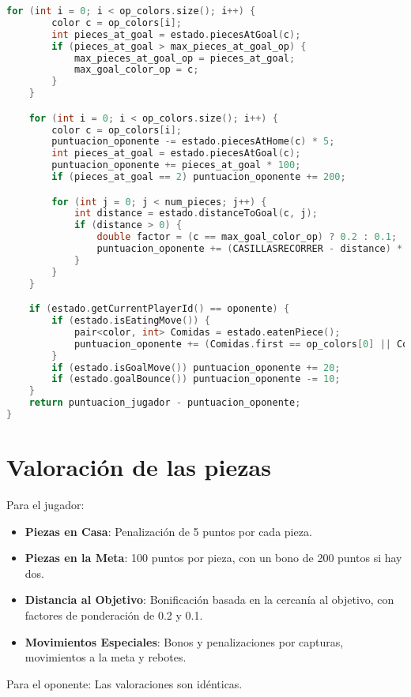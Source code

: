 \documentclass[a4paper, 11pt]{article}
\begin{document}
\begin{lstlisting}[language=C++]
    for (int i = 0; i < op_colors.size(); i++) {
        color c = op_colors[i];
        int pieces_at_goal = estado.piecesAtGoal(c);
        if (pieces_at_goal > max_pieces_at_goal_op) {
            max_pieces_at_goal_op = pieces_at_goal;
            max_goal_color_op = c;
        }
    }

    for (int i = 0; i < op_colors.size(); i++) {
        color c = op_colors[i];
        puntuacion_oponente -= estado.piecesAtHome(c) * 5;
        int pieces_at_goal = estado.piecesAtGoal(c);
        puntuacion_oponente += pieces_at_goal * 100;
        if (pieces_at_goal == 2) puntuacion_oponente += 200;

        for (int j = 0; j < num_pieces; j++) {
            int distance = estado.distanceToGoal(c, j);
            if (distance > 0) {
                double factor = (c == max_goal_color_op) ? 0.2 : 0.1; 
                puntuacion_oponente += (CASILLASRECORRER - distance) * factor;
            }
        }
    }

    if (estado.getCurrentPlayerId() == oponente) {
        if (estado.isEatingMove()) {
            pair<color, int> Comidas = estado.eatenPiece();
            puntuacion_oponente += (Comidas.first == op_colors[0] || Comidas.first == op_colors[1]) ? 10 : 50;
        }
        if (estado.isGoalMove()) puntuacion_oponente += 20;
        if (estado.goalBounce()) puntuacion_oponente -= 10;
    }
    return puntuacion_jugador - puntuacion_oponente;
}
\end{lstlisting}

\section{Valoración de las piezas}

Para el jugador:
\begin{itemize}
    \item \textbf{Piezas en Casa}: Penalización de 5 puntos por cada pieza.
    \item \textbf{Piezas en la Meta}: 100 puntos por pieza, con un bono de 200 puntos si hay dos.
    \item \textbf{Distancia al Objetivo}: Bonificación basada en la cercanía al objetivo, con factores de ponderación de 0.2 y 0.1.
    \item \textbf{Movimientos Especiales}: Bonos y penalizaciones por capturas, movimientos a la meta y rebotes.
\end{itemize}

Para el oponente: 
Las valoraciones son idénticas.
\end{document}
